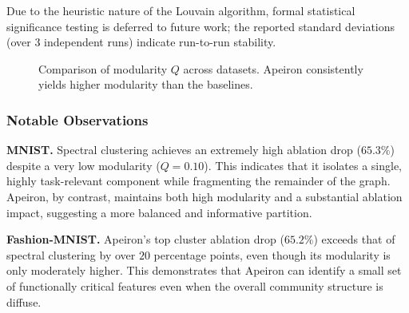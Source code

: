 Due to the heuristic nature of the Louvain algorithm, formal statistical significance testing is deferred to future work; the reported standard deviations (over 3 independent runs) indicate run-to-run stability.

\begin{figure}[htbp]
\centering
{}
\caption{Comparison of modularity $Q$ across datasets. Apeiron consistently yields higher modularity than the baselines.}
\label{fig:modularity_barchart}
\end{figure}

\subsubsection{Notable Observations}

\textbf{MNIST.} Spectral clustering achieves an extremely high ablation drop ($65.3\%$) despite a very low modularity ($Q = 0.10$). This indicates that it isolates a single, highly task-relevant component while fragmenting the remainder of the graph. Apeiron, by contrast, maintains both high modularity and a substantial ablation impact, suggesting a more balanced and informative partition.

\textbf{Fashion-MNIST.} Apeiron's top cluster ablation drop ($65.2\%$) exceeds that of spectral clustering by over $20$ percentage points, even though its modularity is only moderately higher. This demonstrates that Apeiron can identify a small set of functionally critical features even when the overall community structure is diffuse.

